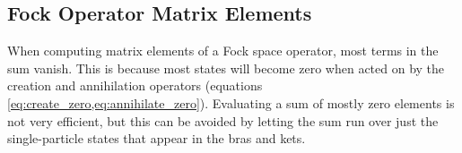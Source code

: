 \documentclass[../main/report.tex]{subfiles}
\begin{document}
\subsection{Fock Operator Matrix Elements}

When computing matrix elements of a Fock space operator, most terms in the sum vanish. 
This is because most states will become zero when acted on by the creation and annihilation operators (equations \cref{eq:create_zero,eq:annihilate_zero}).
Evaluating a sum of mostly zero elements is not very efficient, but this can be 
avoided by letting the sum run over just the single-particle states that appear in the bras and kets.
\end{document}
